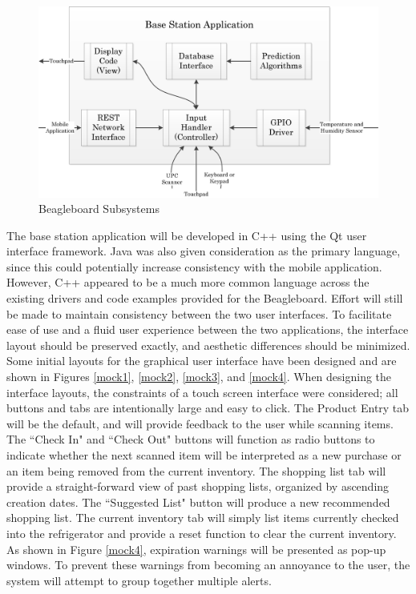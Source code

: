 \documentclass[11pt]{article} %
\begin{document}
\begin{figure}[h!]
\vspace{0.5cm}
\begin{center}
\includegraphics[scale=0.8]{../Graphics/BaseStation}
\caption{Beagleboard Subsystems}
\label{fig:basecode}
\end{center}
\end{figure}
\newline \quad \newline
The base station application will be developed in C++ using the Qt user interface framework. Java was also given consideration as the primary language, since this could potentially increase consistency with the mobile application. However, C++ appeared to be a much more common language across the existing drivers and code examples provided for the Beagleboard. Effort will still be made to maintain consistency between the two user interfaces. To facilitate ease of use and a fluid user experience between the two applications, the interface layout should be preserved exactly, and aesthetic differences should be minimized. Some initial layouts for the graphical user interface have been designed and are shown in Figures \ref{mock1}, \ref{mock2}, \ref{mock3}, and \ref{mock4}. When designing the interface layouts, the constraints of a touch screen interface were considered; all buttons and tabs are intentionally large and easy to click. The Product Entry tab will be the default, and will provide feedback to the user while scanning items. The ``Check In" and ``Check Out" buttons will function as radio buttons to indicate whether the next scanned item will be interpreted as a new purchase or an item being removed from the current inventory. The shopping list tab will provide a straight-forward view of past shopping lists, organized by ascending creation dates. The ``Suggested List" button will produce a new recommended shopping list. The current inventory tab will simply list items currently checked into the refrigerator and provide a reset function to clear the current inventory. As shown in Figure \ref{mock4}, expiration warnings will be presented as pop-up windows. To prevent these warnings from becoming an annoyance to the user, the system will attempt to group together multiple alerts.
\end{document}
